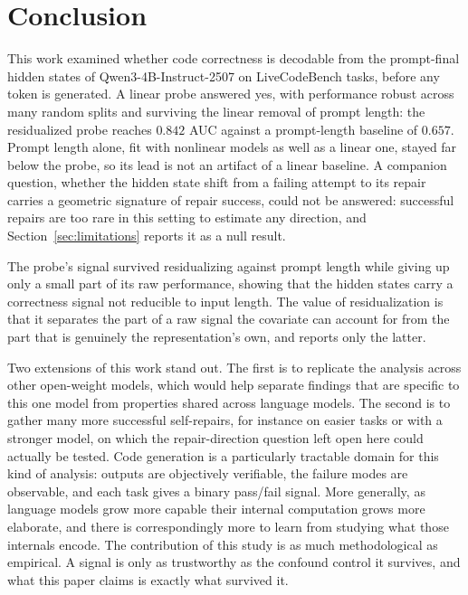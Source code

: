 \section{Conclusion}
\label{sec:conclusion}

This work examined whether code correctness is decodable from the prompt-final hidden states of Qwen3-4B-Instruct-2507 on LiveCodeBench tasks, before any token is generated.
A linear probe answered yes, with performance robust across many random splits and surviving the linear removal of prompt length: the residualized probe reaches $0.842$ AUC against a prompt-length baseline of $0.657$.
Prompt length alone, fit with nonlinear models as well as a linear one, stayed far below the probe, so its lead is not an artifact of a linear baseline.
A companion question, whether the hidden state shift from a failing attempt to its repair carries a geometric signature of repair success, could not be answered: successful repairs are too rare in this setting to estimate any direction, and Section~\ref{sec:limitations} reports it as a null result.

The probe's signal survived residualizing against prompt length while giving up only a small part of its raw performance, showing that the hidden states carry a correctness signal not reducible to input length.
The value of residualization is that it separates the part of a raw signal the covariate can account for from the part that is genuinely the representation's own, and reports only the latter.

Two extensions of this work stand out. The first is to replicate the analysis across other open-weight models, which would help separate findings that are specific to this one model from properties shared across language models.
The second is to gather many more successful self-repairs, for instance on easier tasks or with a stronger model, on which the repair-direction question left open here could actually be tested.
Code generation is a particularly tractable domain for this kind of analysis: outputs are objectively verifiable, the failure modes are observable, and each task gives a binary pass/fail signal. More generally, as language models grow more capable their internal computation grows more elaborate, and there is correspondingly more to learn from studying what those internals encode.
The contribution of this study is as much methodological as empirical. A signal is only as trustworthy as the confound control it survives, and what this paper claims is exactly what survived it.
